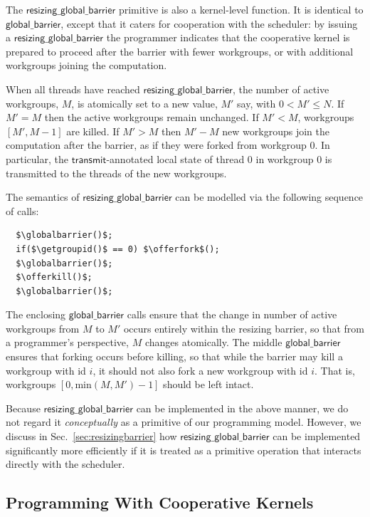 \documentclass[numbers,nocopyrightspace,10pt]{sigplanconf}
\newcommand{\mysec}{Sec.~}
\newcommand{\transmit}{\mathsf{transmit}}
\newcommand{\offerfork}{\mathsf{offer\_fork}}
\newcommand{\offerkill}{\mathsf{offer\_kill}}
\newcommand{\globalbarrier}{\mathsf{global\_barrier}}
\newcommand{\resizingglobalbarrier}{\mathsf{resizing\_global\_barrier}}
\newcommand{\getgroupid}{\mathsf{get\_group\_id}}
\begin{document}
The $\resizingglobalbarrier$ primitive is also a kernel-level
function.  It is identical to $\globalbarrier$, except that it caters
for cooperation with the scheduler: by issuing a
$\resizingglobalbarrier$ the programmer indicates that the cooperative
kernel is prepared to proceed after the barrier with fewer workgroups,
or with additional workgroups joining the computation.

When all threads have reached $\resizingglobalbarrier$,
the number of active workgroups, $M$, is atomically set to a new value, $M'$ say, with $0 < M' \leq N$.
If $M' = M$ then the active workgroups remain unchanged.  If $M' < M$, workgroups $[M', M-1]$ are
killed.  If $M' > M$ then $M'-M$ new workgroups join the computation after the barrier,
as if they were forked from workgroup 0.  In particular, the
$\transmit$-annotated local state of thread 0 in workgroup 0 is
transmitted to the threads of the new workgroups.

The semantics of $\resizingglobalbarrier$ can be modelled via the following sequence of calls:

\lstset{basicstyle=\tt,numbers=none}
\begin{lstlisting}
  $\globalbarrier()$;
  if($\getgroupid()$ == 0) $\offerfork$();
  $\globalbarrier()$;
  $\offerkill()$;
  $\globalbarrier()$;
\end{lstlisting}
\lstset{basicstyle=\scriptsize\tt,numbers=left}

The enclosing $\globalbarrier$ calls ensure that the change in number
of active workgroups from $M$ to $M'$ occurs entirely within the
resizing barrier, so that from a programmer's perspective, $M$ changes atomically.  The middle $\globalbarrier$ ensures that forking occurs before killing, so that while the barrier may kill a workgroup with id $i$, it should not also fork a new workgroup with id $i$.  That is, workgroups $[0, \textrm{min}(M, M') - 1]$ should be left intact.

Because $\resizingglobalbarrier$ can be implemented in the above
manner, we do not regard it \emph{conceptually} as a primitive of our
programming model.  However, we discuss in
\mysec\ref{sec:resizingbarrier} how $\resizingglobalbarrier$ can be
implemented significantly more efficiently if it is treated as a
primitive operation that interacts directly with the scheduler.

\subsection{Programming With Cooperative Kernels}\label{sec:programmingguidelines}
\end{document}
